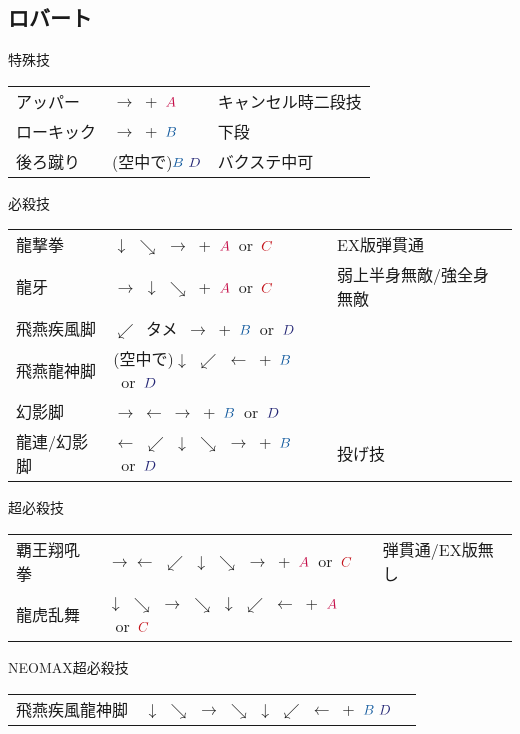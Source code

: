 \documentclass[a4j,11pt]{jarticle}
\def\A{\textcolor{Acolor}{A}}
\def\C{\textcolor{Ccolor}{C}}
\def\B{\textcolor{Bcolor}{B}}
\def\D{\textcolor{Dcolor}{D}}
\def\hien{$\swarrow$\ タメ\ $\rightarrow$}
\def\hado{$\downarrow$ $\searrow$ $\rightarrow$}%
\def\tatsu{$\downarrow$ $\swarrow$ $\leftarrow$}%
\def\syoryu{$\rightarrow$ $\downarrow$ $\searrow$}%
\def\yoga{$\leftarrow$ $\swarrow$ $\downarrow$ $\searrow$ $\rightarrow$}%
\def\ryuko{$\downarrow$ $\searrow$ $\rightarrow$ $\searrow$ $\downarrow$ $\swarrow$ $\leftarrow$}%
\begin{document}
\subsection{ロバート}
\begin{itembox}[l]{特殊技}
\begin{tabular}{lll}
アッパー&$\rightarrow$\ +\ $\A$&キャンセル時二段技\\%
ローキック&$\rightarrow$\ +\ $\B$&下段\\%
後ろ蹴り&(空中で)$\B\ \D$&バクステ中可%
\end{tabular}
\end{itembox}
\begin{itembox}[l]{必殺技}
\begin{tabular}{lll}
龍撃拳&\hado\ +\ $\A$\ or\ $\C$&EX版弾貫通\\%
龍牙&\syoryu\ +\ $\A$\ or\ $\C$&弱上半身無敵/強全身無敵\\%
飛燕疾風脚&\hien\ +\ $\B$\ or\ $\D$&\\%
飛燕龍神脚&(空中で)\tatsu\ +\ $\B$\ or\ $\D$&\\%
幻影脚&$\rightarrow\ \leftarrow\ \rightarrow$\ +\ $\B$\ or\ $\D$&\\%
龍連/幻影脚&\yoga\ +\ $\B$\ or\ $\D$&投げ技%
\end{tabular}
\end{itembox}
\begin{itembox}[l]{超必殺技}
\begin{tabular}{lll}
覇王翔吼拳&$\rightarrow$\yoga\ +\ $\A$\ or\ $\C$&弾貫通/EX版無し\\%
龍虎乱舞&\ryuko\ +\ $\A$\ or\ $\C$&%
\end{tabular}
\end{itembox}
\begin{itembox}[l]{NEOMAX超必殺技}
\begin{tabular}{lll}
飛燕疾風龍神脚&\ryuko\ +\ $\B\ \D$&%
\end{tabular}
\end{itembox}
\newpage
\end{document}
